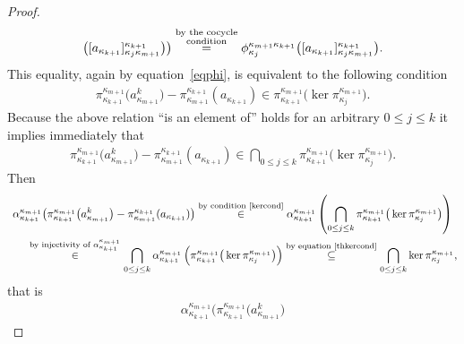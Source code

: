 \begin{proof}
\begin{gather*}
 \big([a_{\kappa_{k+1}}]^{\kappa_{k+1}}_{\kappa_j\kappa_{m+1}}
\big) \big)
\overset{\substack{\text{by the cocycle} \\ \text{condition\vphantom{q}}}}{=} \phi^{\kappa_{m+1}\kappa_{k+1}}_{\kappa_j}\big([a_{\kappa_{k+1}}]^{\kappa_{k+1}}_{\kappa_j\kappa_{m+1}}\big).
\end{gather*}
This equality, again by equation~\eqref{eqphi}, is equivalent to the following condition
\begin{gather*}
\pi^{\kappa_{m+1}}_{\kappa_{k+1}}\big(a^k_{\kappa_{m+1}}\big)-\pi^{\kappa_{k+1}}_{\kappa_{m+1}}(a_{\kappa_{k+1}})
\in\pi^{\kappa_{m+1}}_{\kappa_{k+1}}\big(\ker\pi^{\kappa_{m+1}}_{\kappa_j}\big).
\end{gather*}
Because the above relation ``is an element of'' holds for an arbitrary $0\leq j\leq k$ it implies immediately that
\begin{gather}
\label{kercond}
\pi^{\kappa_{m+1}}_{\kappa_{k+1}}\big(a^k_{\kappa_{m+1}}\big)-\pi^{\kappa_{k+1}}_{\kappa_{m+1}}(a_{\kappa_{k+1}})
\in\bigcap_{0\leq j\leq k}\pi^{\kappa_{m+1}}_{\kappa_{k+1}}\big(\ker\pi^{\kappa_{m+1}}_{\kappa_j}\big).
\end{gather}
Then
\begin{gather*}
\alpha^{\kappa_{m+1}}_{\kappa_{k+1}}\big(\pi^{\kappa_{m+1}}_{\kappa_{k+1}}\big(a^k_{\kappa_{m+1}}\big)
-\pi^{\kappa_{k+1}}_{\kappa_{m+1}}(a_{\kappa_{k+1}})\big)
\overset{\text{by condition~\eqref{kercond}}}{\in}
\alpha^{\kappa_{m+1}}_{\kappa_{k+1}}\left(\bigcap_{0\leq j\leq k}\pi^{\kappa_{m+1}}_{\kappa_{k+1}}\big(\ker\pi^{\kappa_{m+1}}_{\kappa_j}\big) \right)
\\
\qquad
\overset{\text{by injectivity of $\alpha^{\kappa_{m+1}}_{\kappa_{k+1}}$}}{\in}
\bigcap_{0\leq j\leq k}
\alpha^{\kappa_{m+1}}_{\kappa_{k+1}}\left(\pi^{\kappa_{m+1}}_{\kappa_{k+1}}\big(\ker\pi^{\kappa_{m+1}}_{\kappa_j}\big)\right)
\overset{\text{by equation~\eqref{thkercond}}}{\subseteq}
\bigcap_{0\leq j\leq k}\ker\pi^{\kappa_{m+1}}_{\kappa_j},
\end{gather*}
that is
\begin{gather*}
\alpha^{\kappa_{m+1}}_{\kappa_{k+1}}\big(\pi^{\kappa_{m+1}}_{\kappa_{k+1}}\big(a^k_{\kappa_{m+1}}\big)

\end{gather*}
\end{proof}
